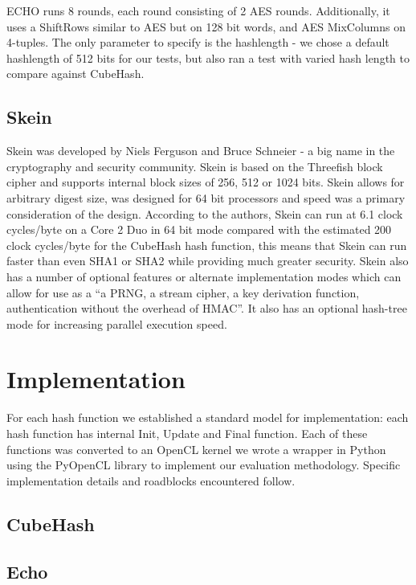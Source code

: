 \documentclass{article}
\begin{document}
ECHO runs 8 rounds, each round consisting of 2 AES rounds.  Additionally, it uses a ShiftRows similar to AES but on 128 bit words, and AES MixColumns on 4-tuples. The only parameter to specify is the hashlength - we chose a default hashlength of 512 bits for our tests, but also ran a test with varied hash length to compare against CubeHash.

\subsection*{Skein}
Skein was developed by Niels Ferguson and Bruce Schneier - a big name in the cryptography and security community.
Skein is based on the Threefish block cipher and supports internal block sizes of 256, 512 or 1024 bits.
Skein allows for arbitrary digest size, was designed for 64 bit processors and speed was a primary consideration of the design.
According to the authors, Skein can run at 6.1 clock cycles/byte on a Core 2 Duo in 64 bit mode\cite{SkeinSpeed} compared with the estimated 200 clock cycles/byte for the CubeHash hash function, this means that Skein can run faster than even SHA1 or SHA2 while providing much greater security.
Skein also has a number of optional features or alternate implementation modes which can allow for use as a ``a PRNG, a stream cipher, a key derivation function, authentication without the overhead of HMAC''\cite{SkeinSpeed}.
It also has an optional hash-tree mode for increasing parallel execution speed. 


\section*{Implementation}

For each hash function we established a standard model for implementation: each hash function has internal Init, Update and Final function.
Each of these functions was converted to an OpenCL kernel we wrote a wrapper in Python using the PyOpenCL library to implement our evaluation methodology.  Specific implementation details and roadblocks encountered follow.

\subsection*{CubeHash}

\subsection*{Echo}
\end{document}
